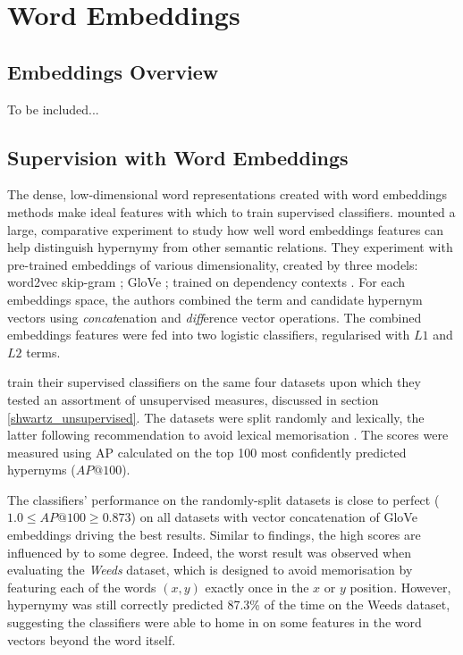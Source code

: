 \section{Word Embeddings}
\subsection{Embeddings Overview}
To be included...
\subsection{Supervision with Word Embeddings} \label{supervised_embeddings}
The dense, low-dimensional word representations created with word embeddings methods make ideal features with which to train supervised classifiers.  \citep{shwartz2017siege} mounted a large, comparative experiment to study how well word embeddings features can help distinguish hypernymy from other semantic relations.  They experiment with pre-trained embeddings of various dimensionality, created by three models: word2vec skip-gram \citep{mikolov2013distributed}; GloVe \citep{pennington2014glove}; trained on dependency contexts \citep{levy2014dependency}.  For each embeddings space, the authors combined the term and candidate hypernym vectors using \textit{concat}enation \citep{baroni2012entailment} and \textit{diff}erence \citep{roller2014inclusive} vector operations.  The combined embeddings features were fed into two logistic classifiers, regularised with $L1$ and $L2$ terms.

\citeauthor{shwartz2017siege} train their supervised classifiers on the same four datasets upon which they tested an assortment of unsupervised measures, discussed in section \ref{shwartz_unsupervised}.  The datasets were split randomly and lexically, the latter following \citeauthor{levy2015supervised} recommendation to avoid lexical memorisation \citep{levy2015supervised}.  The scores were measured using \ac{AP} calculated on the top 100 most confidently predicted hypernyms ($AP@100$).

The classifiers’ performance on the randomly-split datasets is close to perfect ($1.0 \leq AP@100 \geq 0.873$) on all datasets with vector concatenation of GloVe embeddings driving the best results.  Similar to \citeauthor{levy2015supervised} findings, the high scores are influenced by  to some degree.  Indeed, the worst result was observed when evaluating the \textit{Weeds} \citep{weeds2014learning} dataset, which is designed to avoid memorisation by featuring each of the words $(x, y)$ exactly once in the $x$ or $y$ position.  However, hypernymy was still correctly predicted 87.3\% of the time on the Weeds dataset, suggesting the classifiers were able to home in on some features in the word vectors beyond the word itself.

